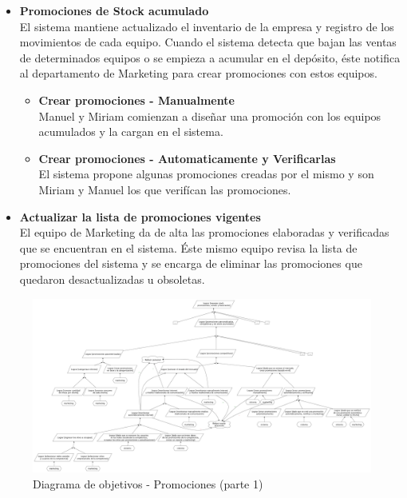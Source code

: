 \begin{itemize}
  \item \textbf{Promociones de Stock acumulado} \\
    El sistema mantiene actualizado el inventario de la empresa y registro de los movimientos de cada equipo. Cuando el sistema detecta que bajan las ventas de determinados equipos o se empieza a acumular en el depósito, éste notifica al departamento de Marketing para crear promociones con estos equipos.
  \begin{itemize}
    \item \textbf{Crear promociones - Manualmente} \\
      Manuel y Miriam comienzan a diseñar una promoción con los equipos acumulados y la cargan en el sistema.
    \item \textbf{Crear promociones - Automaticamente y Verificarlas} \\
      El sistema propone algunas promociones creadas por el mismo y son Miriam y Manuel los que verifícan las promociones.
  \end{itemize}

  \item \textbf{Actualizar la lista de promociones vigentes} \\
    El equipo de Marketing da de alta las promociones elaboradas y verificadas que se encuentran en el sistema. Éste mismo equipo revisa la lista de promociones del sistema y se encarga de eliminar las promociones que quedaron desactualizadas u obsoletas.

\end{itemize}

\clearpage

\begin{figure}[h!]
  \centering
  \includegraphics[width=1.5\textwidth, angle=90]{./imagenes/promociones_1.pdf}
  \caption{Diagrama de objetivos - Promociones (parte 1)}
  \label{fig:diagProm1}
\end{figure}

